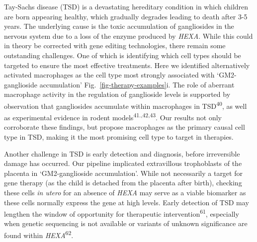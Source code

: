 \documentclass[
]{article}
\begin{document}
Tay-Sachs disease (TSD) is a devastating hereditary condition in which
children are born appearing healthy, which gradually degrades leading to
death after 3-5 years. The underlying cause is the toxic accumulation of
gangliosides in the nervous system due to a loss of the enzyme produced
by \emph{HEXA}. While this could in theory be corrected with gene
editing technologies, there remain some outstanding challenges. One of
which is identifying which cell types should be targeted to ensure the
most effective treatments. Here we identified alternatively activated
macrophages as the cell type most strongly associated with
`GM2-ganglioside accumulation' Fig.~\ref{fig-therapy-examples}i. The
role of aberrant macrophage activity in the regulation of ganglioside
levels is supported by observation that gangliosides accumulate within
macrophages in TSD\textsuperscript{40}, as well as experimental evidence
in rodent models\textsuperscript{41.,42,43}. Our results not only
corroborate these findings, but propose macrophages as the primary
causal cell type in TSD, making it the most promising cell type to
target in therapies.

Another challenge in TSD is early detection and diagnosis, before
irreversible damage has occurred. Our pipeline implicated extravillous
trophoblasts of the placenta in `GM2-ganglioside accumulation'. While
not necessarily a target for gene therapy (as the child is detached from
the placenta after birth), checking these cells \emph{in utero} for an
absence of \emph{HEXA} may serve as a viable biomarker as these cells
normally express the gene at high levels. Early detection of TSD may
lengthen the window of opportunity for therapeutic
intervention\textsuperscript{61}, especially when genetic sequencing is
not available or variants of unknown significance are found within
\emph{HEXA}\textsuperscript{62}.
\end{document}
